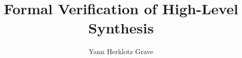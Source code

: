 \documentclass[svgnames,enabledeprecatedfontcommands]{scrbook}
\begin{document}
\title{Formal Verification of High-Level Synthesis}
\author{Yann Herklotz Grave}

\maketitle





\printbibliography
\end{document}
